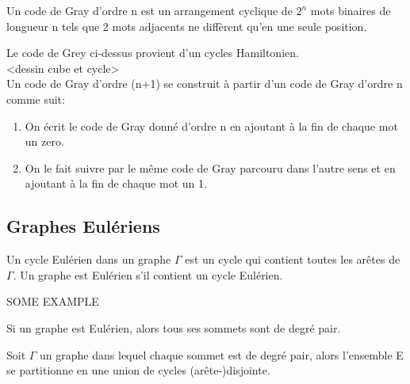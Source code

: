 Un code de Gray d'ordre n est un arrangement cyclique de $2^{n}$ mots binaires de longueur n tels que 2 mots adjacents ne diffèrent qu'en une seule position.\\

\begin{exmp}
\end{exmp}




Le code de Grey ci-dessus provient d'un cycles Hamiltonien.\\

<dessin cube et cycle>\\

Un code de Gray d'ordre (n+1) se construit à partir d'un code de Gray d'ordre n comme suit:

\begin{enumerate}
	\item On écrit le code de Gray donné d'ordre n en ajoutant à la fin de chaque mot un zero.
	\item On le fait suivre par le même code de Gray parcouru dans l'autre sens et en ajoutant à la fin de chaque mot un 1.
\end{enumerate}


\subsection{Graphes Eulériens}

\begin{defn}
Un cycle Eulérien dans un graphe $\Gamma$ est un cycle qui contient toutes les arêtes de $\Gamma$.
Un graphe est Eulérien s'il contient un cycle Eulérien.\\
\end{defn}

\begin{exmp}
SOME EXAMPLE\\
\end{exmp}

\begin{prop}
Si un graphe est Eulérien, alors tous ses sommets sont de degré pair.\\
\end{prop}

\begin{lemme}
Soit $\Gamma$ un graphe dans lequel chaque sommet est de degré pair, alors l'ensemble E se partitionne en une union de cycles (arête-)disjointe.\\
\end{lemme}

